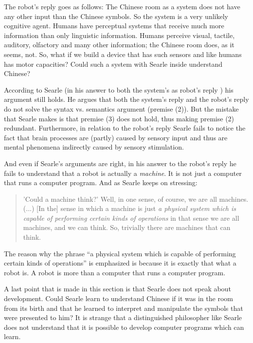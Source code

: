 The robot's reply goes as follows: The Chinese room as a system does not have any other input than the Chinese symbols. So the system is a very unlikely cognitive agent. Humans have perceptual systems that receive much more information than only linguistic information. Humans perceive visual, tactile, auditory, olfactory and many other information; the Chinese room does, as it seems, not. So, what if we build a device that has such sensors and like humans has motor capacities? Could such a system with Searle inside understand Chinese?

According to Searle (in his answer to both the system's as robot's reply \cite{searle:1984}) his argument still holds. He argues that both the system's reply and the robot's reply do not solve the syntax vs. semantics argument (premise (2)). But the mistake that Searle makes is that premise (3) does not hold, thus making premise (2) redundant. Furthermore, in relation to the robot's reply Searle fails to notice the fact that brain processes are (partly) caused by sensory input and thus are mental phenomena indirectly caused by sensory stimulation.

And even if Searle's arguments are right, in his answer to the robot's reply he fails to understand that a robot is actually a {\em machine}. It is not just a computer that runs a computer program. And as Searle keeps on stressing:

\begin{quote}
'Could a machine think?' Well, in one sense, of course, we are all machines. (...) [In the] sense in which a machine is just {\em a physical system which is capable of performing certain kinds of operations} in that sense we are all machines, and we can think. So, trivially there are machines that can think. \cite[p. 35, my italics]{searle:1984}
\end{quote}

The reason why the phrase ``a physical system which is capable of performing certain kinds of operations'' is emphasized is because it is exactly that what a robot is. A robot is more than a computer that runs a computer program.

A last point that is made in this section is that Searle does not speak about development. Could Searle learn to understand Chinese if it was in the room from its birth and that he learned to interpret and manipulate the symbols that were presented to him? It is strange that a distinguished philosopher like Searle does not understand that it is possible to develop computer programs which can learn.

